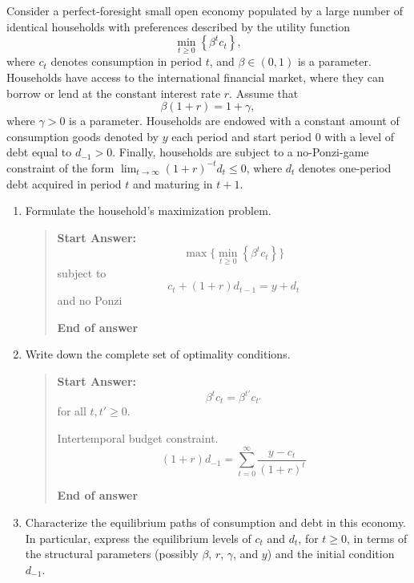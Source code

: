 \begin{exercise}
Consider  a perfect-foresight small open economy populated by a large number of identical households with preferences described by the utility
function
\[
 \min_{t\ge0} 
\left\{\beta^tc_t\right\},
\]
where  $c_t$ denotes consumption in period $t$,  and $\beta\in(0,1)$ is a parameter. 
 Households have access to the international financial market, where they can borrow or lend at the constant interest rate $r$. Assume that 
\[
\beta(1+r)=1+\gamma,
\]
where $\gamma>0$ is a parameter.  Households are endowed with a constant amount of  consumption goods denoted   by $y$ each period  and  start period 0 with a level of debt
equal to  $d_{-1}>0$.  
Finally, 
households are subject to a  no-Ponzi-game constraint of the form $\lim_{t\rightarrow\infty}(1+r)^{-t}d_t\le 0$, where $d_t$ denotes 
one-period debt  acquired in period $t$ and maturing in $t+1$. 
\begin{enumerate}
\item Formulate the household's maximization problem. 

\begin{quote}
{\bf Start Answer: } 
\[
\max\{ \min_{t\ge0} 
\left\{\beta^tc_t\right\}
\}
\]
subject to 
\[
c_t + (1+r) d_{t-1}  = y + d_t
\]
and no Ponzi

{\bf End of answer}
\end{quote}
\item Write down the complete set of optimality conditions. 
\begin{quote}
{\bf Start Answer: } 
\[
\beta^tc_t = \beta^{t'} c_{t'}
\]
for all $t, t'\ge 0$. 

Intertemporal budget constraint. 
\[
 (1+r) d_{-1} = \sum_{t=0}^{\infty} 
\frac{
y-c_t
}
{(1+r)^t}
\]

{\bf End of answer}

\end{quote}

\item Characterize the equilibrium paths of consumption and debt in this economy. 
In particular, express the equilibrium levels of  $c_t$ and $d_t$, for $t\ge0$, in terms of the structural parameters (possibly $\beta$, $r$, $\gamma$, and $y$)  and  the initial condition $d_{-1}$. 



\end{enumerate}
\end{exercise}
